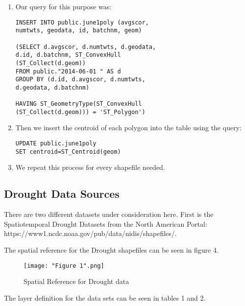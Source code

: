 \documentclass[conference]{IEEEtran}
\begin{document}
\begin{enumerate}
	\item Our query for this purpose was:
\begin{lstlisting}
INSERT INTO public.june1poly (avgscor, 
numtwts, geodata, id, batchnm, geom)

(SELECT d.avgscor, d.numtwts, d.geodata, 
d.id, d.batchnm, ST_ConvexHull
(ST_Collect(d.geom))
FROM public."2014-06-01 " AS d
GROUP BY (d.id, d.avgscor, d.numtwts,
d.geodata, d.batchnm)

HAVING ST_GeometryType(ST_ConvexHull
(ST_Collect(d.geom))) = 'ST_Polygon')
\end{lstlisting}
	\item Then we insert the centroid of each polygon into the table using the query:

\begin{lstlisting}
UPDATE public.june1poly 
SET centroid=ST_Centroid(geom)
\end{lstlisting}

	\item We repeat this process for every shapefile needed.
\end{enumerate}

\subsection{Drought Data Sources}

There are two different datasets under consideration here. First is the Spatiotemporal Drought Datasets from the North American Portal: https://www1.ncdc.noaa.gov/pub/data/nidis/shapefiles/.



The spatial reference for the Drought shapefiles can be seen in figure 4.  

\begin{figure}[ht]
\centerline{\texttt{[image: "Figure 1".png]}}
\caption{Spatial Reference for Drought data}
\label{Figure 4}
\end{figure}



The layer definition for the data sets can be seen in tables 1 and 2.
\end{document}

